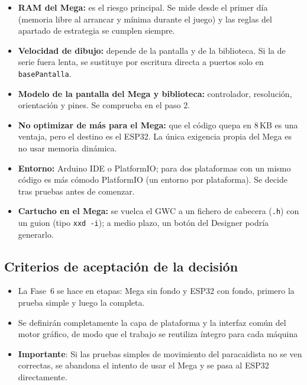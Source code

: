 \begin{itemize}
	\item \textbf{RAM del Mega:} es el riesgo principal. Se mide desde el primer día (memoria libre al arrancar y mínima durante el juego) y las reglas del apartado de estrategia se cumplen siempre.
	\item \textbf{Velocidad de dibujo:} depende de la pantalla y de la biblioteca. Si la de serie fuera lenta, se sustituye por escritura directa a puertos solo en \texttt{basePantalla}.
	\item \textbf{Modelo de la pantalla del Mega y biblioteca:} controlador, resolución, orientación y pines. Se comprueba en el paso 2.
	\item \textbf{No optimizar de más para el Mega:} que el código quepa en 8\,KB es una ventaja, pero el destino es el ESP32. La única exigencia propia del Mega es no usar memoria dinámica.
	\item \textbf{Entorno:} Arduino IDE o PlatformIO; para dos plataformas con un mismo código es más cómodo PlatformIO (un entorno por plataforma). Se decide tras pruebas antes de comenzar.
	\item \textbf{Cartucho en el Mega:} se vuelca el GWC a un fichero de cabecera (\texttt{.h}) con un guion (tipo \texttt{xxd -i}); a medio plazo, un botón del Designer podría generarlo.
\end{itemize}

\subsection{Criterios de aceptación de la decisión}
\label{sec:F6I01Criterios}

\begin{itemize}
	\item La Fase~6 se hace en etapas: Mega sin fondo y ESP32 con fondo, primero la prueba simple y luego la completa.
	\item Se definirán completamente la capa de plataforma y la interfaz común del motor gráfico, de modo que el trabajo se reutiliza íntegro para cada máquina
	\item \textbf{Importante}: Si las pruebas simples de movimiento del paracaidista no se ven correctas, se abandona el intento de usar el Mega y se pasa al ESP32 directamente.
\end{itemize}

\clearpage
